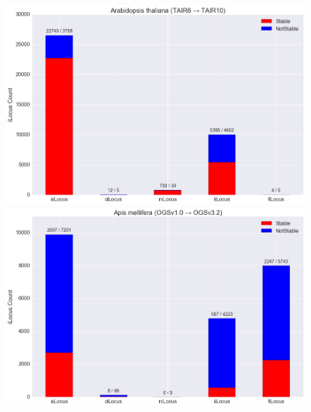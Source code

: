 \begin{figure}[h]
\centering
\includegraphics[width=6in]{Assets/Graphics/iLoci/atha-stable.png} \par
\vspace{50px}
\includegraphics[width=6in]{Assets/Graphics/iLoci/amel-stable.png}
\caption{~}
\label{Fig:iLociStable}
\end{figure}

